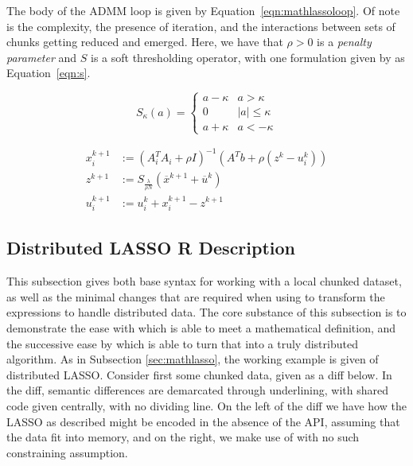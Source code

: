 \documentclass[letterpaper, inpress]{jds} %
\begin{document}
The body of the ADMM loop is given by Equation~\ref{eqn:mathlassoloop}.
Of note is the complexity, the presence of iteration, and the interactions between sets of chunks getting reduced and emerged.
Here, we have that $\rho > 0$ is a \textit{penalty parameter} and $S$ is a soft thresholding operator, with one formulation given by \citet{boyd2011} as Equation~\ref{eqn:s}.

\begin{equation}\label{eqn:s}
S_\kappa(a) = \left\{ \begin{array}{cl}
a - \kappa & a > \kappa \\
0 & |a| \leq \kappa \\
a + \kappa & a < -\kappa
\end{array} \right.
\end{equation}

\begin{equation}\label{eqn:mathlassoloop}
    \begin{aligned}
        x_i^{k+1} &:= (A_i^T A_i + \rho I)^{-1}(A^T b + \rho(z^k - u_i^k))\\
        z^{k+1} &:= S_\frac{\lambda}{\rho N} (\overline{x}^{k+1} + \overline{u}^k) \\
        u_i^{k+1} &:= u_i^k + x_i^{k+1} - z^{k+1}
    \end{aligned} 
\end{equation}

\subsection{Distributed LASSO R Description}\label{sec:rlasso}

This subsection gives both base  syntax for working with a local chunked dataset, as well as the minimal changes that are required when using  to transform the expressions to handle distributed data.
The core substance of this subsection is to demonstrate the ease with which  is able to meet a mathematical definition, and the successive ease by which  is able to turn that into a truly distributed algorithm.
As in Subsection \ref{sec:mathlasso}, the working example is given of distributed LASSO.
Consider first some chunked data, given as a diff below.
In the diff, semantic differences are demarcated through underlining, with shared code given centrally, with no dividing line.
On the left of the diff we have how the LASSO as described might be encoded in the absence of the API, assuming that the data fit into memory, and on the right, we make use of  with no such constraining assumption.
\end{document}
